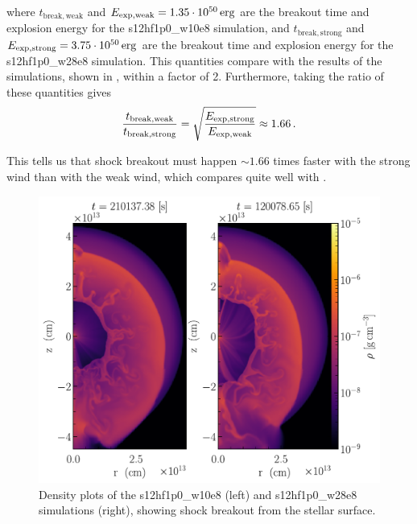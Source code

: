 where \(t_\mathrm{break,weak}\) and \(E_\mathrm{exp,weak} = 1.35 \cdot 10^{50}\,\mathrm{erg}\) are the breakout time and explosion energy for the s12hf1p0\_w10e8 simulation, and \(t_\mathrm{break,strong}\) and \(E_\mathrm{exp,strong} = 3.75 \cdot 10^{50}\,\mathrm{erg}\) are the breakout time and explosion energy for the s12hf1p0\_w28e8 simulation. This quantities compare with the results of the simulations, shown in , within a factor of 2. Furthermore, taking the ratio of these quantities gives
\begin{equation}
    \frac{t_\mathrm{break,weak}}{t_\mathrm{break,strong}} = \sqrt{\frac{E_\mathrm{exp,strong}}{E_\mathrm{exp,weak}}} \approx 1.66 \,\mathrm{.}
\end{equation}

This tells us that shock breakout must happen \(\sim1.66\) times faster with the strong wind than with the weak wind, which compares quite well with .

\begin{figure}[ht!]
    \centering
    \includegraphics[width=1.0\linewidth]{figures/s12hf1p0_break.pdf}
    \caption{Density plots of the s12hf1p0\_w10e8 (left) and s12hf1p0\_w28e8 simulations (right), showing shock breakout from the stellar surface.}
    \label{fig:s12hf1p0_break}
\end{figure}
